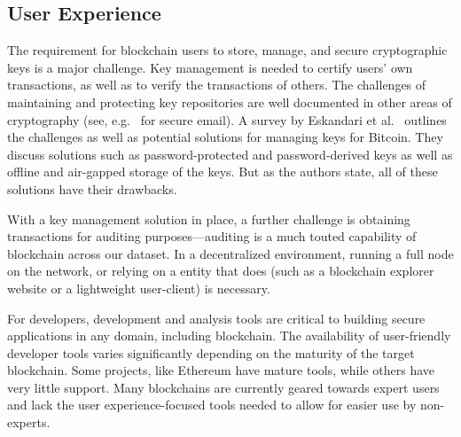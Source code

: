\subsection{User Experience}

The requirement for blockchain users to store, manage, and secure cryptographic keys is a major challenge. Key management is needed to certify users' own transactions, as well as to verify the transactions of others.  The challenges of maintaining and protecting key repositories are well documented in other areas of cryptography (see, e.g.~\cite{uss:WhiTyg99} for secure email). A survey by Eskandari et al.~\cite{arxiv:ECBS18} outlines the challenges as well as potential solutions for managing keys for Bitcoin. They discuss solutions such as password-protected and password-derived keys as well as offline and air-gapped storage of the keys.  But as the authors state, all of these solutions have their drawbacks.

With a key management solution in place, a further challenge is obtaining transactions for auditing purposes---auditing is a much touted capability of blockchain across our dataset. In a decentralized environment, running a full node on the network, or relying on a entity that does (such as a blockchain explorer website or a lightweight user-client) is necessary. 

For developers, development and analysis tools are critical to building secure applications in any domain, including blockchain. The availability of user-friendly developer tools varies significantly depending on the maturity of the target blockchain. Some projects, like Ethereum have mature tools, while others have very little support. Many blockchains are currently geared towards expert users and lack the user experience-focused tools needed to allow for easier use by non-experts.

 

